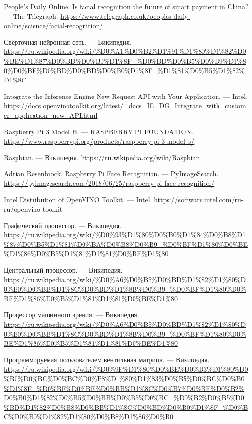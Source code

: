 \documentclass[14pt,a4paper]{scrartcl}
\begin{document}
\begin{thebibliography}{9}
	People's Daily Online. Is facial recognition the future of smart payment in China? 
	\newblock --- The Telegraph. \url{https://www.telegraph.co.uk/peoples-daily-online/science/facial-recognition/}
	
	Свёрточная нейронная сеть. 
	\newblock --- Википедия.
 	\url{https://ru.wikipedia.org/wiki/%D0%A1%D0%B2%D1%91%D1%80%D1%82%D0%BE%D1%87%D0%BD%D0%B0%D1%8F_%D0%BD%D0%B5%D0%B9%D1%80%D0%BE%D0%BD%D0%BD%D0%B0%D1%8F_%D1%81%D0%B5%D1%82%D1%8C}
	
	Integrate the Inference Engine New Request API with Your Application.
	\newblock --- Intel. \url{https://docs.openvinotoolkit.org/latest/_docs_IE_DG_Integrate_with_customer_application_new_API.html}
	
	Raspberry Pi 3 Model B.
	\newblock --- RASPBERRY PI FOUNDATION. \url{https://www.raspberrypi.org/products/raspberry-pi-3-model-b/}
	
	Raspbian.
	\newblock --- Википедия. \url{https://ru.wikipedia.org/wiki/Raspbian}
	
	Adrian Rosenbrock. Raspberry Pi Face Recognition.
	\newblock --- PyImageSearch. \url{https://pyimagesearch.com/2018/06/25/raspberry-pi-face-recognition/}
	
	Intel Distribution of OpenVINO Toolkit.
	\newblock --- Intel. \url{https://software.intel.com/ru-ru/openvino-toolkit}
	
	Графический процессор.
	\newblock --- Википедия. \url{https://ru.wikipedia.org/wiki/%D0%93%D1%80%D0%B0%D1%84%D0%B8%D1%87%D0%B5%D1%81%D0%BA%D0%B8%D0%B9_%D0%BF%D1%80%D0%BE%D1%86%D0%B5%D1%81%D1%81%D0%BE%D1%80}
	
	Центральный процессор.
	\newblock --- Википедия. \url{https://ru.wikipedia.org/wiki/%D0%A6%D0%B5%D0%BD%D1%82%D1%80%D0%B0%D0%BB%D1%8C%D0%BD%D1%8B%D0%B9_%D0%BF%D1%80%D0%BE%D1%86%D0%B5%D1%81%D1%81%D0%BE%D1%80}
		
	Процессор машинного зрения.
	\newblock --- Википедия. \url{https://ru.wikipedia.org/wiki/%D0%A6%D0%B5%D0%BD%D1%82%D1%80%D0%B0%D0%BB%D1%8C%D0%BD%D1%8B%D0%B9_%D0%BF%D1%80%D0%BE%D1%86%D0%B5%D1%81%D1%81%D0%BE%D1%80}
		
	Программируемая пользователем вентильная матрица.
	\newblock --- Википедия. \url{https://ru.wikipedia.org/wiki/%D0%9F%D1%80%D0%BE%D0%B3%D1%80%D0%B0%D0%BC%D0%BC%D0%B8%D1%80%D1%83%D0%B5%D0%BC%D0%B0%D1%8F_%D0%BF%D0%BE%D0%BB%D1%8C%D0%B7%D0%BE%D0%B2%D0%B0%D1%82%D0%B5%D0%BB%D0%B5%D0%BC_%D0%B2%D0%B5%D0%BD%D1%82%D0%B8%D0%BB%D1%8C%D0%BD%D0%B0%D1%8F_%D0%BC%D0%B0%D1%82%D1%80%D0%B8%D1%86%D0%B0}
		

\end{thebibliography}
\end{document}
